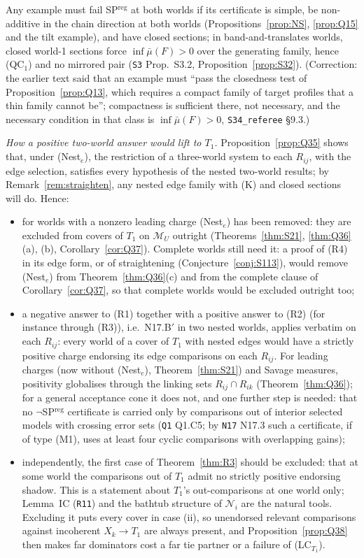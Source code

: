 \documentclass[11pt]{article}
\theoremstyle{definition}
\theoremstyle{remark}
\newcommand{\M}{\mathcal M}
\newcommand{\src}[1]{\texttt{#1}}
\begin{document}
Any example must fail SP$^{\mathrm{reg}}$ at both worlds if its certificate is simple, be non-additive in the chain direction at both worlds (Propositions~\ref{prop:NS}, \ref{prop:Q15} and the tilt example), and have closed sections; in band-and-translates worlds, closed world-1 sections force $\inf\bar\mu(F)>0$ over the generating family, hence (QC$_1$) and no mirrored pair (\src{S3} Prop.~S3.2, Proposition~\ref{prop:S32}). (Correction: the earlier text said that an example must ``pass the closedness test of Proposition~\ref{prop:Q13}, which requires a compact family of target profiles that a thin family cannot be''; compactness is sufficient there, not necessary, and the necessary condition in that class is $\inf\bar\mu(F)>0$, \src{S34\_referee} \S9.3.)

\emph{How a positive two-world answer would lift to $T_1$.} Proposition~\ref{prop:Q35} shows that, under (Nest$_e$), the restriction of a three-world system to each $R_{ij}$, with the edge selection, satisfies every hypothesis of the nested two-world results; by Remark~\ref{rem:straighten}, any nested edge family with (K) and closed sections will do. Hence:
\begin{itemize}[leftmargin=*]
\item for worlds with a nonzero leading charge (Nest$_e$) has been removed: they are excluded from covers of $T_1$ on $\M_U$ outright (Theorems~\ref{thm:S21}, \ref{thm:Q36}(a), (b), Corollary~\ref{cor:Q37}). Complete worlds still need it: a proof of (R4) in its edge form, or of straightening (Conjecture~\ref{conj:S113}), would remove (Nest$_e$) from Theorem~\ref{thm:Q36}(c) and from the complete clause of Corollary~\ref{cor:Q37}, so that complete worlds would be excluded outright too;
\item a negative answer to (R1) together with a positive answer to (R2) (for instance through (R3)), i.e.\ N17.B$'$ in two nested worlds, applies verbatim on each $R_{ij}$: every world of a cover of $T_1$ with nested edges would have a strictly positive charge endorsing its edge comparisons on each $R_{ij}$. For leading charges (now without (Nest$_e$), Theorem~\ref{thm:S21}) and Savage measures, positivity globalises through the linking sets $R_{ij}\cap R_{ik}$ (Theorem~\ref{thm:Q36}); for a general acceptance cone it does not, and one further step is needed: that no $\neg$SP$^{\mathrm{reg}}$ certificate is carried only by comparisons out of interior selected models with crossing error sets (\src{Q1} Q1.C5; by \src{N17} N17.3 such a certificate, if of type (M1), uses at least four cyclic comparisons with overlapping gains);
\item independently, the first case of Theorem~\ref{thm:R3} should be excluded: that at some world the comparisons out of $T_1$ admit no strictly positive endorsing shadow. This is a statement about $T_1$'s out-comparisons at one world only; Lemma~IC (\src{R11}) and the bathtub structure of $\mathcal N_i$ are the natural tools. Excluding it puts every cover in case (ii), so unendorsed relevant comparisons against incoherent $X_k\to T_1$ are always present, and Proposition~\ref{prop:Q38} then makes far dominators cost a far tie partner or a failure of (LC$_{T_1}$).
\end{itemize}
\end{document}
